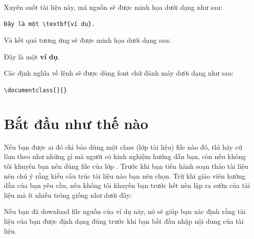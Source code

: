 \documentclass[a4paper]{report}
\begin{document}
\noindent Xuyên suốt tài liệu này, mã nguồn sẽ được minh họa dưới dạng như sau:

\begin{code}
\begin{verbatim}
Đây là một \textbf{ví dụ}.
\end{verbatim}
\end{code}%
\noindent
Và kết quả tương ứng sẽ được minh họa dưới dạng sau:

\begin{result}
Đây là một \textbf{ví dụ}.
\end{result}%
Các định nghĩa về lệnh sẽ được dùng font chữ đánh máy dưới dạng như sau:

\begin{definition}
\verb|\documentclass[|\verb|]{|\verb|}|
\end{definition}


\chapter{Bắt đầu như thế nào}

Nếu bạn được ai đó chỉ bảo dùng một class (lớp tài liệu) file nào đó, thì hãy cứ làm theo như những gì mà người có kinh nghiệm hướng dẫn bạn, còn nếu không tôi khuyên bạn nên dùng file của lớp . Trước khi bạn tiến hành soạn thảo tài liệu nên chú ý rằng kiểu cấu trúc tài liệu nào bạn nên chọn. Trừ khi giáo viên hướng dẫn của bạn yêu cầu, nếu không tôi khuyên bạn trước hết nên lập ra sườn của tài liệu mà ít nhiều trông giống như dưới đây:
  
\label{ex:thesis1}

Nếu bạn đã download file nguồn của ví dụ này, nó sẽ giúp bạn xác định rằng tài liệu của bạn được định dạng đúng trước khi bạn bắt đầu nhập nội dung của tài liệu.
\end{document}
